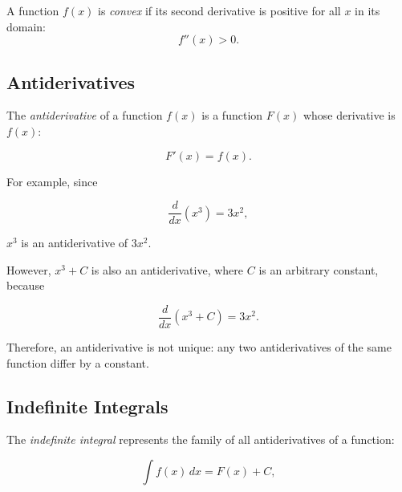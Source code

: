 \documentclass[12pt]{article}
\begin{document}
A function \(f(x)\) is \emph{convex} if its second derivative is positive for all \(x\) in its domain:
\[
f''(x) > 0.
\]  

\begin{center}
\end{center}


\subsection{Antiderivatives}

The \emph{antiderivative} of a function \(f(x)\) is a function \(F(x)\) whose derivative is \(f(x)\):

\[
F'(x) = f(x).
\]

For example, since

\[
\frac{d}{dx}(x^3) = 3x^2,
\]

\(x^3\) is an antiderivative of \(3x^2\).

However, \(x^3+C\) is also an antiderivative, where \(C\) is an arbitrary constant, because

\[
\frac{d}{dx}(x^3+C) = 3x^2.
\]

Therefore, an antiderivative is not unique: any two antiderivatives of the same function differ by a constant.

\subsection{Indefinite Integrals}

The \emph{indefinite integral} represents the family of all antiderivatives of a function:

\[
\int f(x)\,dx = F(x)+C,
\]
\end{document}

